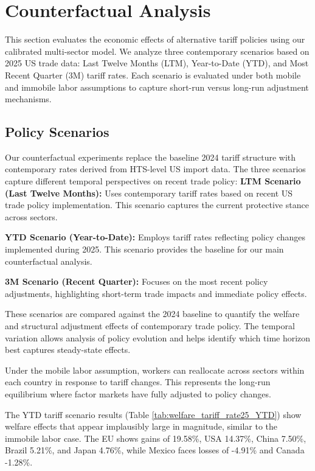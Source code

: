 \section{Counterfactual Analysis}

This section evaluates the economic effects of alternative tariff policies using our calibrated multi-sector model. We analyze three contemporary scenarios based on 2025 US trade data: Last Twelve Months (LTM), Year-to-Date (YTD), and Most Recent Quarter (3M) tariff rates. Each scenario is evaluated under both mobile and immobile labor assumptions to capture short-run versus long-run adjustment mechanisms.

\subsection{Policy Scenarios}

Our counterfactual experiments replace the baseline 2024 tariff structure with contemporary rates derived from HTS-level US import data. The three scenarios capture different temporal perspectives on recent trade policy:
\textbf{LTM Scenario (Last Twelve Months):} Uses contemporary tariff rates based on recent US trade policy implementation. This scenario captures the current protective stance across sectors.

\textbf{YTD Scenario (Year-to-Date):} Employs tariff rates reflecting policy changes implemented during 2025. This scenario provides the baseline for our main counterfactual analysis.

\textbf{3M Scenario (Recent Quarter):} Focuses on the most recent policy adjustments, highlighting short-term trade impacts and immediate policy effects.

These scenarios are compared against the 2024 baseline to quantify the welfare and structural adjustment effects of contemporary trade policy. The temporal variation allows analysis of policy evolution and helps identify which time horizon best captures steady-state effects.

Under the mobile labor assumption, workers can reallocate across sectors within each country in response to tariff changes. This represents the long-run equilibrium where factor markets have fully adjusted to policy changes.

The YTD tariff scenario results (Table \ref{tab:welfare_tariff_rate25_YTD}) show welfare effects that appear implausibly large in magnitude, similar to the immobile labor case. The EU shows gains of 19.58\%, USA 14.37\%, China 7.50\%, Brazil 5.21\%, and Japan 4.76\%, while Mexico faces losses of -4.91\% and Canada -1.28\%.

